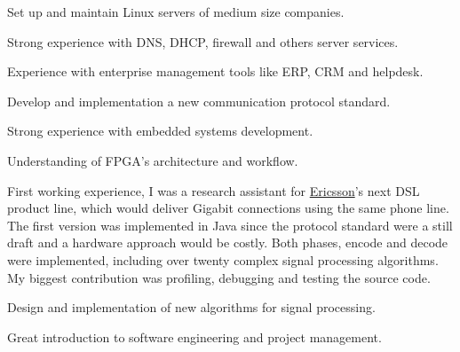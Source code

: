 \documentclass[]{willianpaixao-resume}
\begin{document}
\begin{minipage}[t]{0.64\textwidth}

\begin{tightemize}
\item Set up and maintain Linux servers of medium size companies.
\item Strong experience with DNS, DHCP, firewall and others server services.
\item Experience with enterprise management tools like ERP, CRM and helpdesk.
\end{tightemize}
\sectionsep

\begin{tightemize}
\item Develop and implementation a new communication protocol standard.
\item Strong experience with embedded systems development.
\item Understanding of FPGA's architecture and workflow.
\end{tightemize}
\sectionsep

\sectionsep
First working experience, I was a research assistant for
\href{https://www.ericsson.com/}{Ericsson}'s next DSL product line, which would
deliver Gigabit connections using the same phone line. The first version was
implemented in Java since the protocol standard were a still draft and a
hardware approach would be costly. Both phases, encode and decode were
implemented, including over twenty complex signal processing algorithms. My
biggest contribution was profiling, debugging and testing the source code.
\sectionsep
\begin{tightemize}
    \item Design and implementation of new algorithms for signal processing.
    \item Great introduction to software engineering and project management.
\end{tightemize}
\sectionsep


\end{minipage}
\end{document}
